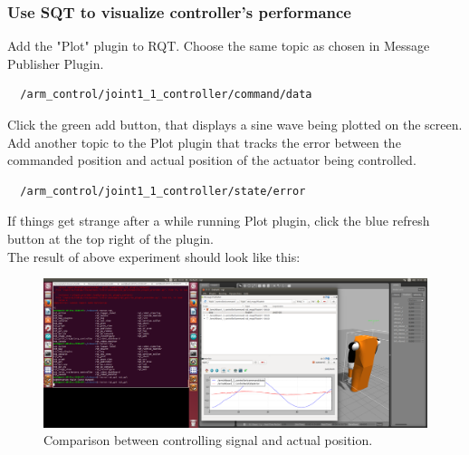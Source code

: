 \documentclass[pdftex,12pt,a4paper]{article}
\begin{document}
  \subsubsection{Use SQT to visualize controller's performance}
  Add the "Plot" plugin to RQT. Choose the same topic as chosen in Message Publisher Plugin.
  \begin{lstlisting}
  /arm_control/joint1_1_controller/command/data
  \end{lstlisting}
  Click the green add button, that displays a sine wave being plotted on the screen.\\
  Add another topic to the Plot plugin that tracks the error between the commanded position and actual position of the actuator being controlled.
  \begin{lstlisting}
  /arm_control/joint1_1_controller/state/error
  \end{lstlisting}
  If things get strange after a while running Plot plugin, click the blue refresh button at the top right of the plugin.\\
  The result of above experiment should look like this:
  \begin{figure}[h]
      \centering
      \includegraphics[width=0.9\linewidth]{image/gazebo_rqt.png}
      \caption{Comparison between controlling signal and actual position.}
      \label{fig:gazebo_rqt}
  \end{figure}
  
  \newpage
\end{document}
